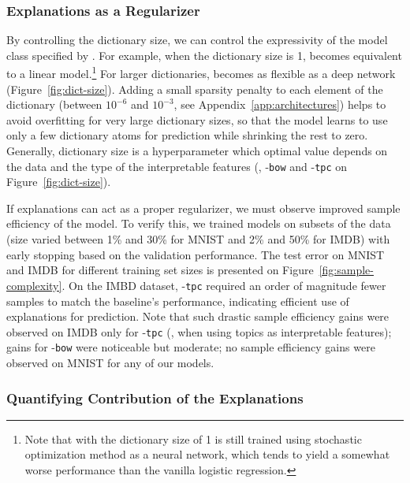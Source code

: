 \documentclass[twoside,11pt]{article}
\begin{document}
\subsubsection{Explanations as a Regularizer}
By controlling the dictionary size, we can control the expressivity of the model class specified by {\CEN}.
For example, when the dictionary size is 1, {\CEN} becomes equivalent to a linear model.\footnote{Note that {\CENs} with the dictionary size of 1 is still trained using stochastic optimization method as a neural network, which tends to yield a somewhat worse performance than the vanilla logistic regression.}
For larger dictionaries, {\CEN} becomes as flexible as a deep network (Figure~\ref{fig:dict-size}).
Adding a small sparsity penalty to each element of the dictionary (between $10^{-6}$ and $10^{-3}$, see Appendix~\ref{app:architectures}) helps to avoid overfitting for very large dictionary sizes, so that the model learns to use only a few dictionary atoms for prediction while shrinking the rest to zero.
Generally, dictionary size is a hyperparameter which optimal value depends on the data and the type of the interpretable features (\cf, \CEN-\texttt{bow} and \CEN-\texttt{tpc} on Figure~\ref{fig:dict-size}).

If explanations can act as a proper regularizer, we must observe improved sample efficiency of the model.
To verify this, we trained \CEN models on subsets of the data (size varied between 1\% and 30\% for MNIST and 2\% and 50\% for IMDB) with early stopping based on the validation performance.
The test error on MNIST and IMDB for different training set sizes is presented on Figure~\ref{fig:sample-complexity}.
On the IMBD dataset, \CEN-\texttt{tpc} required an order of magnitude fewer samples to match the baseline's performance, indicating efficient use of explanations for prediction.
Note that such drastic sample efficiency gains were observed on IMDB only for \CEN-\texttt{tpc} (\ie, when using topics as interpretable features); gains for \CEN-\texttt{bow} were noticeable but moderate; no sample efficiency gains were observed on MNIST for any of our \CEN models.


\subsubsection{Quantifying Contribution of the Explanations}
\label{sec:cen-explanation-contributions}
\end{document}
